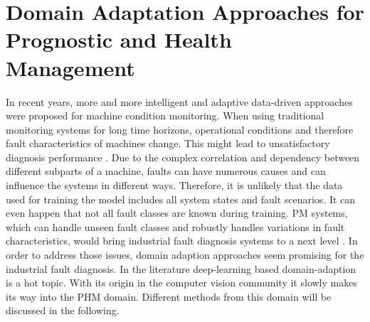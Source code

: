 \section{Domain Adaptation Approaches for Prognostic and Health Management}
In recent years, more and more intelligent and adaptive data-driven approaches were proposed for machine condition monitoring. When using traditional monitoring systems for long time horizons, operational conditions and therefore fault characteristics of machines change. This might lead to unsatisfactory diagnosis performance \cite{AZAMFAR2020103932}. Due to the complex correlation and dependency between different subparts of a machine, faults can have numerous causes and can influence the systems in different ways. Therefore, it is unlikely that the data used for training the model includes all system states and fault scenarios. It can even happen that not all fault classes are known during training. PM systems, which can handle unseen fault classes and robustly handles variations in fault characteristics, would bring industrial fault diagnosis systems to a next level \cite{Michau2017}. In order to address those issues, domain adaption approaches seem promising for the industrial fault diagnosis. In the literature deep-learning based domain-adaption is a hot topic. With its origin in the computer vision community it slowly makes its way into the PHM domain. Different methods from this domain will be discussed in the following. 


